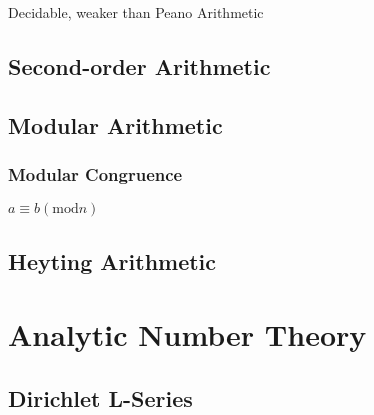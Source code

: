 Decidable, weaker than Peano Arithmetic



\subsection{Second-order Arithmetic}\label{sec:second_order_arithmetic}

\subsection{Modular Arithmetic}\label{sec:modular_arithmetic}

\subsubsection{Modular Congruence}\label{sec:modular_congruence}

$a \equiv b (\mathrm{mod} n)$



\subsection{Heyting Arithmetic}\label{sec:heyting_arithmetic}



\section{Analytic Number Theory}\label{sec:analytic_number_theory}

\subsection{Dirichlet L-Series}\label{sec:l_series}



